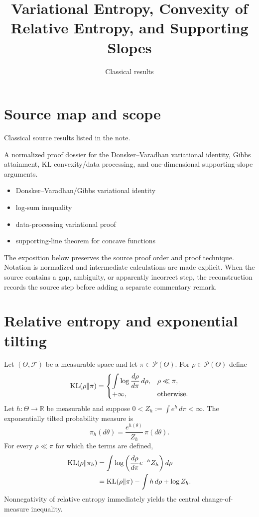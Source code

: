 
\title{Variational Entropy, Convexity of Relative Entropy, and Supporting Slopes}
\author{}
\date{Classical results}

\maketitle

\section*{Source map and scope}
\begin{description}[style=nextline,leftmargin=3.2cm,labelwidth=3cm]
\item[Primary source] Classical source results listed in the note.
\item[Coverage] A normalized proof dossier for the Donsker--Varadhan variational identity, Gibbs attainment, KL convexity/data processing, and one-dimensional supporting-slope arguments.
\item[Source anchors]
\begin{itemize}[leftmargin=2em]
  \item Donsker--Varadhan/Gibbs variational identity
  \item log-sum inequality
  \item data-processing variational proof
  \item supporting-line theorem for concave functions
\end{itemize}
\end{description}

The exposition below preserves the source proof order and proof technique.  Notation is normalized
and intermediate calculations are made explicit.  When the source contains a gap, ambiguity, or
apparently incorrect step, the reconstruction records the source step before adding a separate
commentary remark.

\section{Relative entropy and exponential tilting}
Let $(\Theta,\mathcal F)$ be a measurable space and let $\pi\in\mathcal P(\Theta)$.
For $\rho\in\mathcal P(\Theta)$ define
\[
 \mathrm{KL}(\rho\|\pi)=
 \begin{cases}
  \displaystyle\int\log\frac{d\rho}{d\pi}\,d\rho,&\rho\ll\pi,\\
  +\infty,&\text{otherwise}.
 \end{cases}
\]
Let $h:\Theta\to\mathbb R$ be measurable and suppose
$0<Z_h:=\int e^h\,d\pi<\infty$.  The exponentially tilted probability measure is
\begin{equation}\label{eq:CF-tilt}
 \pi_h(d\theta)=\frac{e^{h(\theta)}}{Z_h}\,\pi(d\theta).
\end{equation}
For every $\rho\ll\pi$ for which the terms are defined,
\begin{align}
 \mathrm{KL}(\rho\|\pi_h)
 &=\int\log\left(\frac{d\rho}{d\pi}e^{-h}Z_h\right)d\rho\\
 &=\mathrm{KL}(\rho\|\pi)-\int h\,d\rho+\log Z_h.
 \label{eq:CF-entropy-decomp}
\end{align}
Nonnegativity of relative entropy immediately yields the central change-of-measure
inequality.

